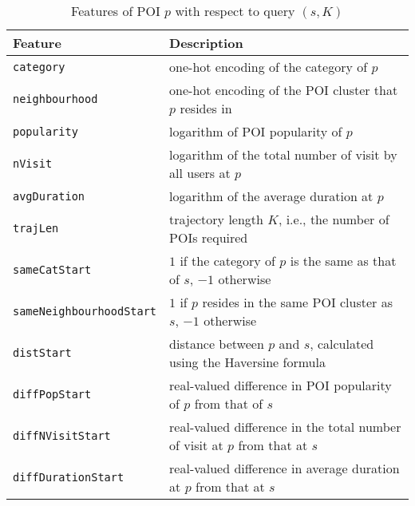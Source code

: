 \begin{table*}[ht]
\caption{Features of POI $p$ with respect to query $(s,K)$}
\label{tab:poifeature}
\centering
\setlength{\tabcolsep}{10pt} %
\begin{tabular}{l|l} \hline
\textbf{Feature}  & \textbf{Description} \\ \hline
\texttt{category}               & one-hot encoding of the category of $p$ \\
\texttt{neighbourhood}          & one-hot encoding of the POI cluster that $p$ resides in \\
\texttt{popularity}             & logarithm of POI popularity of $p$ \\
\texttt{nVisit}                 & logarithm of the total number of visit by all users at $p$ \\
\texttt{avgDuration}            & logarithm of the average duration at $p$ \\ \hline


\texttt{trajLen}                & trajectory length $K$, i.e., the number of POIs required \\
\texttt{sameCatStart}           & $1$ if the category of $p$ is the same as that of $s$, $-1$ otherwise \\
\texttt{sameNeighbourhoodStart} & $1$ if $p$ resides in the same POI cluster as $s$, $-1$ otherwise \\
\texttt{distStart}              & distance between $p$ and $s$, calculated using the Haversine formula \\
\texttt{diffPopStart}           & real-valued difference in POI popularity of $p$ from that of $s$ \\
\texttt{diffNVisitStart}        & real-valued difference in the total number of visit at $p$ from that at $s$ \\
\texttt{diffDurationStart}      & real-valued difference in average duration at $p$ from that at $s$ \\
\hline
\end{tabular}
\end{table*}



